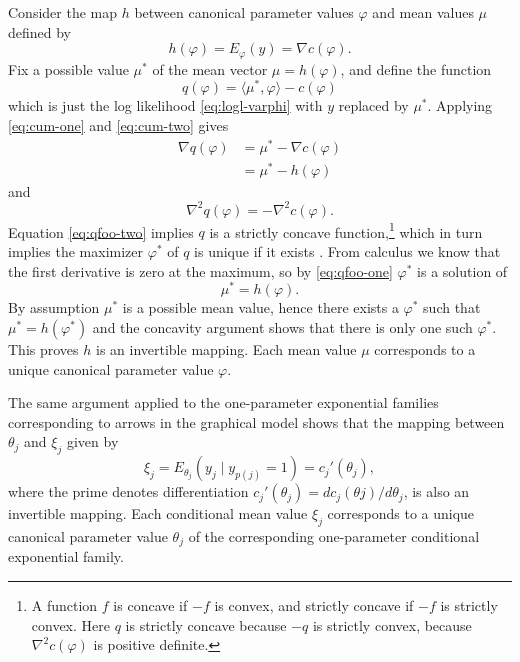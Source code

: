 \documentclass[11pt]{article}
\newcommand{\inner}[1]{\langle #1 \rangle}
\begin{document}
Consider the map $h$ between canonical parameter values $\varphi$ and mean
values $\mu$ defined by
$$
   h(\varphi) = E_\varphi(y) = \nabla c(\varphi).
$$
Fix a possible value $\mu^*$ of the mean vector $\mu = h(\varphi)$,
and define the function
\begin{equation} \label{eq:qfoo-zero}
   q(\varphi) = \inner{\mu^*, \varphi} - c(\varphi)
\end{equation}
which is just the log likelihood \eqref{eq:logl-varphi} with $y$ replaced by
$\mu^*$.  Applying \eqref{eq:cum-one} and \eqref{eq:cum-two} gives
\begin{equation} \label{eq:qfoo-one}
\begin{split}
   \nabla q(\varphi)
   & =
   \mu^* - \nabla c(\varphi)
   \\
   & =
   \mu^* - h(\varphi)
\end{split}
\end{equation}
and
\begin{equation} \label{eq:qfoo-two}
   \nabla^2 q(\varphi) = - \nabla^2 c(\varphi).
\end{equation}
Equation \eqref{eq:qfoo-two} implies $q$ is
a strictly concave function,\footnote{A function $f$ is concave if $- f$ is
convex, and strictly concave if $- f$ is strictly convex.  Here $q$ is
strictly concave because $- q$ is strictly convex,
because $\nabla^2 c(\varphi)$ is positive definite.}
which in turn implies the maximizer $\varphi^*$ of $q$ is unique if it
exists \citep[Theorem~2.6]{rockafellar-wets}.  From calculus we know that the first
derivative is zero at the maximum, so by \eqref{eq:qfoo-one} $\varphi^*$
is a solution of
$$
   \mu^* = h(\varphi).
$$
By assumption $\mu^*$ is a possible mean value, hence there exists
a $\varphi^*$ such that $\mu^* = h(\varphi^*)$ and the concavity argument
shows that there is only one such $\varphi^*$.  This proves $h$ is an
invertible mapping.  Each mean value $\mu$ corresponds to a unique
canonical parameter value $\varphi$.

The same argument applied to the one-parameter exponential families
corresponding to arrows in the graphical model shows
that the mapping between $\theta_j$ and $\xi_j$ given by
$$
   \xi_j = E_{\theta_j}(y_j \mid y_{p(j)} = 1) = c_j'(\theta_j),
$$
where the prime denotes
differentiation $c_j'(\theta_j) = d c_j(\theta j) / d \theta_j$,
is also an invertible mapping.  Each conditional mean value
$\xi_j$ corresponds to a unique canonical parameter value $\theta_j$ of
the corresponding one-parameter conditional exponential family.
\end{document}
